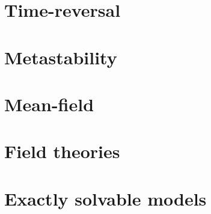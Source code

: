 \documentclass[a4paper]{book}
\theoremstyle{definition}
\theoremstyle{remark}
\begin{document}
\chapter{Time-reversal}

\chapter{Metastability}

\chapter{Mean-field}

\chapter{Field theories}

\chapter{Exactly solvable models}
\end{document}
